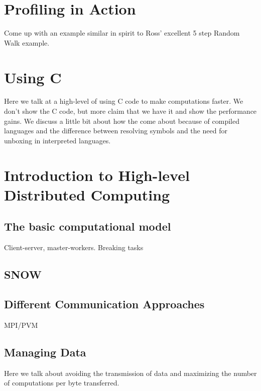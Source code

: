 \section{Profiling in Action}
Come up with an example similar in spirit to Ross'
excellent 5 step Random Walk example.

\section{Using C}
Here we talk at a high-level of using C code to make computations
faster. We don't show the C code, but more claim that we have it and
show the performance gains. We discuss a little bit about how the come
about because of compiled languages and the difference between
resolving symbols and the need for unboxing in interpreted languages.

\section{Introduction to High-level Distributed  Computing}
\subsection{The basic computational model}
Client-server, master-workers.
Breaking tasks 

\subsection{SNOW}

\subsection{Different Communication Approaches}
MPI/PVM

\subsection{Managing Data}
Here we talk about avoiding the transmission of data
and maximizing the number of computations per
byte transferred.
